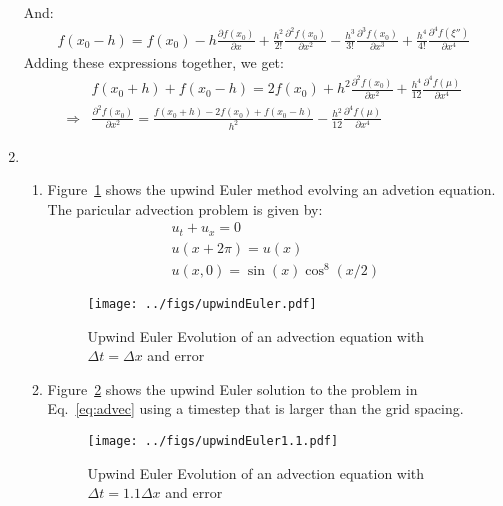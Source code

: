 \documentclass[12pt,a4]{article}
\begin{document}
\begin{enumerate}
    And:
    \begin{align*}
      f(x_0 - h) = f(x_0) - h \frac{\partial f(x_0)}{\partial x} + \frac{h^2}{2!} \frac{\partial^2 f(x_0)}{\partial x^2} - \frac{h^3}{3!} \frac{\partial^3 f(x_0)}{\partial x^3} + \frac{h^4}{4!} \frac{\partial^4 f(\xi '')}{\partial x^4}
    \end{align*}
    Adding these expressions together, we get:
    \begin{align*}
                  & f(x_0 + h) + f(x_0 - h) =  2 f(x_0) + h^2 \frac{\partial^2 f(x_0)}{\partial x^2} + \frac{h^4}{12} \frac{\partial^4 f(\mu)}{\partial x^4}\\
      \Rightarrow & \frac{\partial^2 f(x_0)}{\partial x^2} =\frac{f(x_0 + h) - 2 f(x_0) + f(x_0 - h)}{h^2}  - \frac{h^2}{12} \frac{\partial^4 f(\mu)}{\partial x^4}
    \end{align*}
  \item
    \begin{enumerate}
      \item
        Figure~\ref{fig:upwindEuler} shows the upwind Euler method evolving an advetion equation.
        The paricular advection problem is given by:
        \begin{equation}
          \begin{gathered}
            u_t + u _x = 0\\
            u(x + 2 \pi) = u(x)\\
            u(x, 0) = \sin(x) \cos^8(x / 2)
          \label{eq:advec}
          \end{gathered}
        \end{equation}
        \begin{figure}[H]
          \centering
          \texttt{[image: ../figs/upwindEuler.pdf]} 
          \caption{Upwind Euler Evolution of an advection equation with $\Delta t = \Delta x$ and error}
          \label{fig:upwindEuler}
        \end{figure}

      \item 
        Figure~\ref{fig:upwindEuler1.1.pdf} shows the upwind Euler solution to the problem in Eq.~\ref{eq:advec} using a timestep that is larger than the grid spacing.
        \begin{figure}[H]
          \centering
          \texttt{[image: ../figs/upwindEuler1.1.pdf]}
          \caption{Upwind Euler Evolution of an advection equation with $\Delta t = 1.1\Delta x$ and error}
          \label{fig:upwindEuler1.1.pdf}
        \end{figure}


\end{enumerate}
\end{enumerate}
\end{document}
